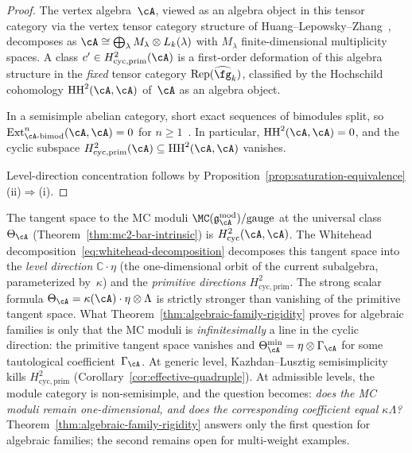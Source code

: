 \begin{proof}
The vertex algebra~$\cA$, viewed as an algebra object in
this tensor category via the vertex tensor category
structure of Huang--Lepowsky--Zhang~\cite{HLZ}, decomposes as
$\cA \cong \bigoplus_\lambda M_\lambda \otimes L_k(\lambda)$
with $M_\lambda$ finite-dimensional multiplicity spaces.
A class $c' \in H^2_{\mathrm{cyc,prim}}(\cA)$ is a
first-order deformation of this algebra structure in the
\emph{fixed} tensor category
$\mathrm{Rep}(\widehat{\fg}_k)$, classified by the
Hochschild cohomology $\mathrm{HH}^2(\cA, \cA)$ of~$\cA$
as an algebra object.

In a semisimple abelian category, short exact sequences
of bimodules split, so
$\mathrm{Ext}^n_{{\cA}\text{-bimod}}({\cA}, {\cA}) = 0$ for
$n \geq 1$~\cite{EGNO}.
In particular,
$\mathrm{HH}^2(\cA, \cA) = 0$, and
the cyclic subspace
$H^2_{\mathrm{cyc,prim}}(\cA)
\subseteq \mathrm{HH}^2(\cA, \cA)$
vanishes.

Level-direction concentration follows by
Proposition~\ref{prop:saturation-equivalence}(ii)$\Rightarrow$(i).
\end{proof}

\begin{remark}
\label{rem:cyclic-rigidity-scope}
The tangent space to the MC moduli
$\MC(\mathfrak{g}_\cA^{\mathrm{mod}})/\mathrm{gauge}$
at the universal class~$\Theta_\cA$
(Theorem~\ref{thm:mc2-bar-intrinsic}) is
$H^2_{\mathrm{cyc}}(\cA, \cA)$.
The Whitehead decomposition~\eqref{eq:whitehead-decomposition}
decomposes this tangent space into the \emph{level direction}
$\mathbb{C}\cdot\eta$ (the one-dimensional orbit of the current
subalgebra, parameterized by~$\kappa$) and the \emph{primitive
directions} $H^2_{\mathrm{cyc,prim}}$.  The strong scalar formula
$\Theta_\cA = \kappa(\cA) \cdot \eta \otimes \Lambda$ is
strictly stronger than vanishing of the primitive tangent space.
What Theorem~\ref{thm:algebraic-family-rigidity} proves for
algebraic families is only that the MC moduli is
\emph{infinitesimally} a line in the cyclic direction: the
primitive tangent space vanishes and
$\Theta_{\cA}^{\min} = \eta \otimes \Gamma_{\cA}$ for some
tautological coefficient~$\Gamma_{\cA}$.
At generic level, Kazhdan--Lusztig semisimplicity kills
$H^2_{\mathrm{cyc,prim}}$
(Corollary~\ref{cor:effective-quadruple}).
At admissible levels, the module category is non-semisimple, and
the question becomes: \emph{does the MC moduli remain
one-dimensional, and does the corresponding coefficient equal
$\kappa\Lambda$?}
Theorem~\ref{thm:algebraic-family-rigidity} answers only the first
question for algebraic families; the second remains open for
multi-weight examples.
\end{remark}

